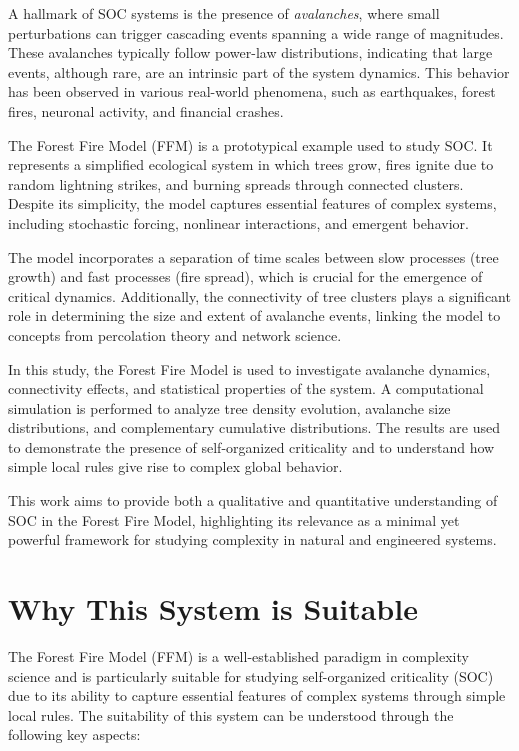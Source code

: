 \documentclass[12pt,a4paper]{article}
\begin{document}
A hallmark of SOC systems is the presence of \textit{avalanches}, where small perturbations can trigger cascading events spanning a wide range of magnitudes. These avalanches typically follow power-law distributions, indicating that large events, although rare, are an intrinsic part of the system dynamics. This behavior has been observed in various real-world phenomena, such as earthquakes, forest fires, neuronal activity, and financial crashes.

The Forest Fire Model (FFM) is a prototypical example used to study SOC. It represents a simplified ecological system in which trees grow, fires ignite due to random lightning strikes, and burning spreads through connected clusters. Despite its simplicity, the model captures essential features of complex systems, including stochastic forcing, nonlinear interactions, and emergent behavior.

The model incorporates a separation of time scales between slow processes (tree growth) and fast processes (fire spread), which is crucial for the emergence of critical dynamics. Additionally, the connectivity of tree clusters plays a significant role in determining the size and extent of avalanche events, linking the model to concepts from percolation theory and network science.

In this study, the Forest Fire Model is used to investigate avalanche dynamics, connectivity effects, and statistical properties of the system. A computational simulation is performed to analyze tree density evolution, avalanche size distributions, and complementary cumulative distributions. The results are used to demonstrate the presence of self-organized criticality and to understand how simple local rules give rise to complex global behavior.

This work aims to provide both a qualitative and quantitative understanding of SOC in the Forest Fire Model, highlighting its relevance as a minimal yet powerful framework for studying complexity in natural and engineered systems.

\section{Why This System is Suitable }

The Forest Fire Model (FFM) is a well-established paradigm in complexity science and is particularly suitable for studying self-organized criticality (SOC) due to its ability to capture essential features of complex systems through simple local rules. The suitability of this system can be understood through the following key aspects:
\end{document}
